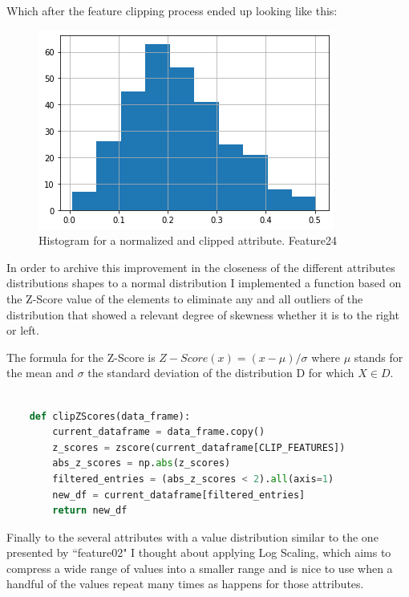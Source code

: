 \documentclass[12pt, a4paper]{article}
\begin{document}
	Which after the feature clipping process ended up looking like this:
	
	\begin{figure}[H]
		\label{Feature24NC}
		\includegraphics{img/plots/feature24NClip.png}
		\caption{Histogram for a normalized and clipped attribute. Feature24}
	\end{figure}

	In order to archive this improvement in the closeness of the different attributes distributions shapes to a normal distribution I implemented a function based on the Z-Score value of the elements to eliminate any and all outliers of the distribution that showed a relevant degree of skewness whether it is to the right or left.
	
	The formula for the Z-Score is $ Z-Score(x) = (x - \mu)/\sigma $ where $\mu$ stands for the mean and $\sigma$ the standard deviation of the distribution D for which $X \in D$.\cite{datascienceZscore}
	
	\vspace{5mm}
	
	\begin{lstlisting}[language=Python]
		
	def clipZScores(data_frame):
		current_dataframe = data_frame.copy()
		z_scores = zscore(current_dataframe[CLIP_FEATURES])
		abs_z_scores = np.abs(z_scores)
		filtered_entries = (abs_z_scores < 2).all(axis=1)
		new_df = current_dataframe[filtered_entries]
		return new_df
	\end{lstlisting}

	Finally to the several attributes with a value distribution similar to the one presented by ``feature02" I thought about applying Log Scaling, which aims to compress a wide range of values into a smaller range and is nice to use when a handful of the values repeat many times as happens for those attributes.\cite{normalizationTechniques}
	
\end{document}
